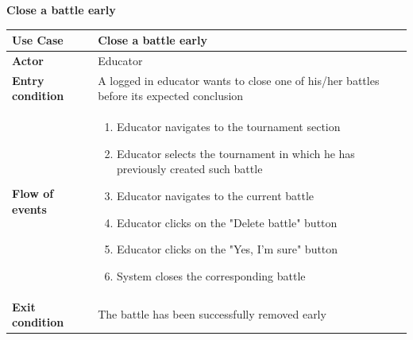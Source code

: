 \documentclass[../RASD.tex]{subfiles}
\begin{document}
        \textbf{Close a battle early}
        \begin{table}[ht]
            \begin{center}
                \begin{tabular}{|m{10em}|m{30em}|}
                \hline
                \textbf{Use Case} & Close a battle early\\
                \hline
                \textbf{Actor} & Educator\\
                \hline
                \textbf{Entry condition} & A logged in educator wants to close one of his/her battles before its expected conclusion\\
                \hline
                \textbf{Flow of events} & 
                    \begin{enumerate}
                        \item Educator navigates to the tournament section \item Educator selects the tournament in which he has previously created such battle
                        \item Educator navigates to the current battle
                        \item Educator clicks on the "Delete battle" button
                        \item Educator clicks on the "Yes, I'm sure" button
                        \item System closes the corresponding battle
                    \end{enumerate}\\
                \hline
                \textbf{Exit condition} & 
                    The battle has been successfully removed early\\
                \hline
                \end{tabular}
            \end{center}
        \end{table}\newpage
\end{document}
